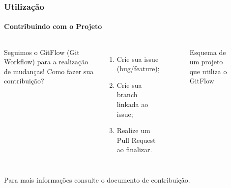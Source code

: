 \documentclass[aspectratio=169]{beamer}
\begin{document}
\begin{frame}
\frametitle{Utilização}
\framesubtitle{Contribuindo com o Projeto}
\begin{columns}
Seguimos o GitFlow (Git Workflow) para a realização de mudanças!
Como fazer sua contribuição?
\vfill
\begin{enumerate}
	\item Crie sua issue (bug/feature);
	\item Crie sua branch linkada ao issue;
	\item Realize um Pull Request ao finalizar.
\end{enumerate}


\begin{figure}[H]
	\centering
	\caption{Esquema de um projeto que utiliza o GitFlow}
\end{figure}

\end{columns}
\vspace{1cm}
Para mais informações consulte o documento de contribuição.
\end{frame}
\end{document}
